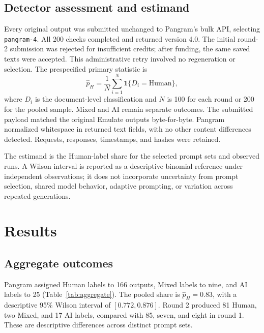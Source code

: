 \documentclass[11pt]{article}
\begin{document}
\subsection{Detector assessment and estimand}
Every original output was submitted unchanged to Pangram's bulk API, selecting \texttt{pangram-4}. All 200 checks completed and returned version 4.0. The initial round-2 submission was rejected for insufficient credits; after funding, the same saved texts were accepted. This administrative retry involved no regeneration or selection. The prespecified primary statistic is
\begin{equation}
 \widehat{p}_{H}=\frac{1}{N}\sum_{i=1}^{N}\mathbf{1}\{D_i=\text{Human}\},
\end{equation}
where $D_i$ is the document-level classification and $N$ is 100 for each round or 200 for the pooled sample. Mixed and AI remain separate outcomes. The submitted payload matched the original Emulate outputs byte-for-byte. Pangram normalized whitespace in returned text fields, with no other content differences detected. Requests, responses, timestamps, and hashes were retained.

The estimand is the Human-label share for the selected prompt sets and observed runs. A Wilson interval is reported as a descriptive binomial reference under independent observations; it does not incorporate uncertainty from prompt selection, shared model behavior, adaptive prompting, or variation across repeated generations.

\section{Results}
\subsection{Aggregate outcomes}
Pangram assigned Human labels to 166 outputs, Mixed labels to nine, and AI labels to 25 (Table~\ref{tab:aggregate}). The pooled share is $\widehat{p}_H=0.83$, with a descriptive 95\% Wilson interval of $[0.772,0.876]$. Round 2 produced 81 Human, two Mixed, and 17 AI labels, compared with 85, seven, and eight in round 1. These are descriptive differences across distinct prompt sets.
\end{document}
